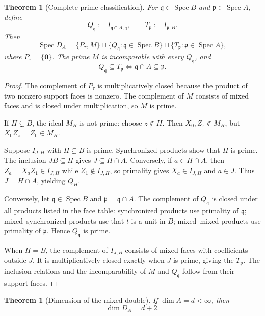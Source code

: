 \documentclass[11pt]{article}
\newtheorem{theorem}[definition]{Theorem}
\newcommand{\Spec}{\operatorname{Spec}}
\begin{document}
\begin{theorem}[Complete prime classification]
For $\mathfrak q\in\Spec B$ and $\mathfrak p\in\Spec A$, define
\[
Q_{\mathfrak q}:=I_{\mathfrak q\cap A,\mathfrak q},
\qquad
T_{\mathfrak p}:=I_{\mathfrak p,B}.
\]
Then
\[
\Spec D_A=
\{P_\tau,M\}
\sqcup\{Q_{\mathfrak q}:\mathfrak q\in\Spec B\}
\sqcup\{T_{\mathfrak p}:\mathfrak p\in\Spec A\},
\]
where $P_\tau=\{\mathbf0\}$.  The prime $M$ is incomparable with every $Q_{\mathfrak q}$, and
\[
Q_{\mathfrak q}\subseteq T_{\mathfrak p}
\iff
\mathfrak q\cap A\subseteq\mathfrak p.
\]
\end{theorem}

\begin{proof}
The complement of $P_\tau$ is multiplicatively closed because the product of two nonzero support faces is nonzero.  The complement of $M$ consists of mixed faces and is closed under multiplication, so $M$ is prime.

If $H\subsetneq B$, the ideal $M_H$ is not prime: choose $z\notin H$.  Then $X_0,Z_z\notin M_H$, but $X_0Z_z=Z_0\in M_H$.

Suppose $I_{J,H}$ with $H\subsetneq B$ is prime.  Synchronized products show that $H$ is prime.  The inclusion $JB\subseteq H$ gives $J\subseteq H\cap A$.  Conversely, if $a\in H\cap A$, then $Z_a=X_aZ_1\in I_{J,H}$ while $Z_1\notin I_{J,H}$, so primality gives $X_a\in I_{J,H}$ and $a\in J$.  Thus $J=H\cap A$, yielding $Q_H$.

Conversely, let $\mathfrak q\in\Spec B$ and $\mathfrak p=\mathfrak q\cap A$.  The complement of $Q_{\mathfrak q}$ is closed under all products listed in the face table: synchronized products use primality of $\mathfrak q$; mixed--synchronized products use that $t$ is a unit in $B$; mixed--mixed products use primality of $\mathfrak p$.  Hence $Q_{\mathfrak q}$ is prime.

When $H=B$, the complement of $I_{J,B}$ consists of mixed faces with coefficients outside $J$.  It is multiplicatively closed exactly when $J$ is prime, giving the $T_{\mathfrak p}$.  The inclusion relations and the incomparability of $M$ and $Q_{\mathfrak q}$ follow from their support faces.
\end{proof}

\begin{theorem}[Dimension of the mixed double]
If $\dim A=d<\infty$, then
\[
\dim D_A=d+2.
\]
\end{theorem}
\end{document}
